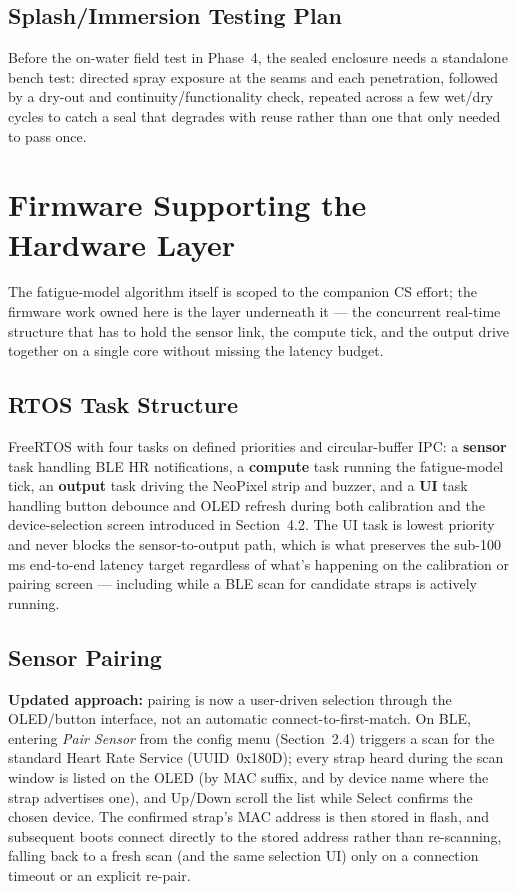 \documentclass[11pt]{article}
\begin{document}
\subsection{Splash/Immersion Testing Plan}
Before the on-water field test in Phase~4, the sealed enclosure needs a standalone bench test: directed spray exposure at the seams and each penetration, followed by a dry-out and continuity/functionality check, repeated across a few wet/dry cycles to catch a seal that degrades with reuse rather than one that only needed to pass once.

\section{Firmware Supporting the Hardware Layer}
The fatigue-model algorithm itself is scoped to the companion CS effort; the firmware work owned here is the layer underneath it --- the concurrent real-time structure that has to hold the sensor link, the compute tick, and the output drive together on a single core without missing the latency budget.

\subsection{RTOS Task Structure}
FreeRTOS with four tasks on defined priorities and circular-buffer IPC: a \textbf{sensor} task handling BLE HR notifications, a \textbf{compute} task running the fatigue-model tick, an \textbf{output} task driving the NeoPixel strip and buzzer, and a \textbf{UI} task handling button debounce and OLED refresh during both calibration and the device-selection screen introduced in Section~4.2. The UI task is lowest priority and never blocks the sensor-to-output path, which is what preserves the sub-100\,ms end-to-end latency target regardless of what's happening on the calibration or pairing screen --- including while a BLE scan for candidate straps is actively running.

\subsection{Sensor Pairing}
\textbf{Updated approach:} pairing is now a user-driven selection through the OLED/button interface, not an automatic connect-to-first-match. On BLE, entering \emph{Pair Sensor} from the config menu (Section~2.4) triggers a scan for the standard Heart Rate Service (UUID~0x180D); every strap heard during the scan window is listed on the OLED (by MAC suffix, and by device name where the strap advertises one), and Up/Down scroll the list while Select confirms the chosen device. The confirmed strap's MAC address is then stored in flash, and subsequent boots connect directly to the stored address rather than re-scanning, falling back to a fresh scan (and the same selection UI) only on a connection timeout or an explicit re-pair.
\end{document}

